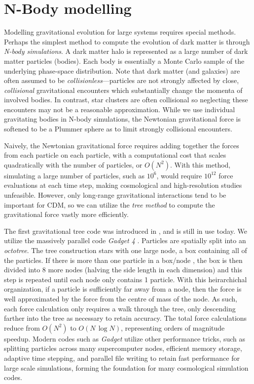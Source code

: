 \section{N-Body modelling}\label{n-body-modelling}

Modelling gravitational evolution for large systems requires special
methods. Perhaps the simplest method to compute the evolution of dark
matter is through \emph{N-body simulations}. A dark matter halo is
represented as a large number of dark matter particles (bodies). Each
body is essentially a Monte Carlo sample of the underlying phase-space
distribution. Note that dark matter (and galaxies) are often assumed to
be \emph{collisionless}---particles are not strongly affected by close,
\emph{collisional} gravitational encounters which substantially change
the momenta of involved bodies. In contrast, star clusters are often
collisional so neglecting these encounters may not be a reasonable
approximation. While we use individual gravitating bodies in N-body
simulations, the Newtonian gravitational force is softened to be a
Plummer sphere as to limit strongly collisional encounters.

Naively, the Newtonian gravitational force requires adding together the
forces from each particle on each particle, with a computational cost
that scales quadratically with the number of particles, or \(O(N^2)\).
With this method, simulating a large number of particles, such as
\(10^6\), would require \(10^{12}\) force evaluations at each time step,
making cosmological and high-resolution studies unfeasible. However,
only long-range gravitational interactions tend to be important for CDM,
so we can utilize the \emph{tree method} to compute the gravitational
force vastly more efficiently.

The first gravitational tree code was introduced in
\citet{barnes+hut1986}, and is still in use today. We utilize the
massively parallel code \emph{Gadget 4} \citep{gadget4}. Particles are
spatially split into an \emph{octotree}. The tree construction stars
with one large node, a box containing all of the particles. If there is
more than one particle in a box/node , the box is then divided into 8
more nodes (halving the side length in each dimension) and this step is
repeated until each node only contains 1 particle. With this
heirarchichal organization, if a particle is sufficiently far away from
a node, then the force is well approximated by the force from the centre
of mass of the node. As such, each force calculation only requires a
walk through the tree, only descending farther into the tree as
necessary to retain accuracy. The total force calculations reduce from
\(O(N^2)\) to \(O(N\,\log N)\), representing orders of magnitude
speedup. Modern codes such as \emph{Gadget} utilize other performance
tricks, such as splitting particles across many supercomputer nodes,
efficient memory storage, adaptive time stepping, and parallel file
writing to retain fast performance for large scale simulations, forming
the foundation for many cosmological simulation codes.

